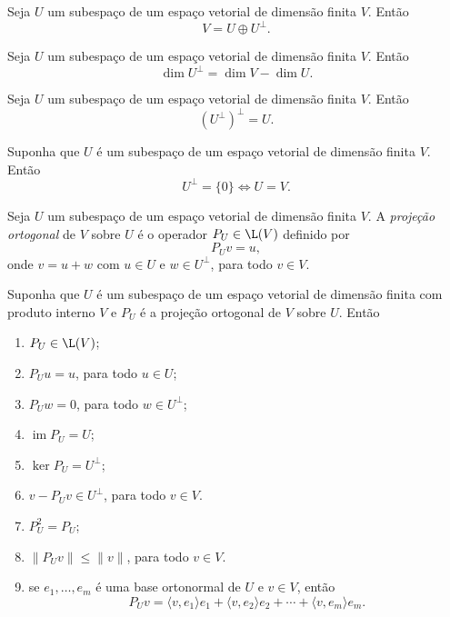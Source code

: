 \documentclass{article}
\DeclareMathOperator{\im}{im}
\begin{document}
\begin{prop}
    Seja \(U\) um subespaço de um espaço vetorial de dimensão finita \(V\). Então
    \[
        V = U \oplus U^\perp.
    \]
\end{prop}

\begin{cor}
    Seja \(U\) um subespaço de um espaço vetorial de dimensão finita \(V\). Então
    \[
        \dim U^\perp = \dim V - \dim U.
    \]
\end{cor}

\begin{cor}
    Seja \(U\) um subespaço de um espaço vetorial de dimensão finita \(V\). Então
    \[
        (U^\perp)^\perp = U.
    \]
\end{cor}

\begin{cor}
    Suponha que \(U\) é um subespaço de um espaço vetorial de dimensão finita \(V\). Então 
    \[
        U^\perp = \{0\} \iff U = V.
    \]
\end{cor}

\begin{defn}
    Seja \(U\) um subespaço de um espaço vetorial de dimensão finita \(V\). A \emph{projeção ortogonal} de \(V\) sobre \(U\) é o operador \(P_U \in \L(V)\) definido por 
    \[
        P_U v = u,
    \]
    \noindent onde \(v = u + w\) com \(u \in U\) e \(w \in U^\perp\), para todo \(v \in V\).
\end{defn}

\begin{prop} 
    Suponha que \(U\) é um subespaço de um espaço vetorial de dimensão finita com produto interno \(V\) e \(P_U\) é a projeção ortogonal de \(V\) sobre \(U\). Então
    \begin{enumerate}
        \item [(a)] \(P_U \in \L(V)\);
        \item [(b)] \(P_U u = u\), para todo \(u \in U\);
        \item [(c)] \(P_U w = 0\), para todo \(w \in U^\perp\);
        \item [(d)] \(\im P_U = U\);
        \item [(e)] \(\ker P_U = U^\perp\);
        \item [(f)] \(v - P_U v \in U^\perp\), para todo \(v \in V\).
        \item [(g)] \(P_U^2 = P_U\);
        \item [(h)] \(\|P_U v\| \leq \|v\|\), para todo \(v \in V\).
        \item [(i)] se \(e_1, \ldots, e_m\) é uma base ortonormal de \(U\) e \(v \in V\), então
        \[
            P_U v = \langle v, e_1 \rangle e_1 + \langle v, e_2 \rangle e_2 + \cdots + \langle v, e_m \rangle e_m.
        \]
    \end{enumerate}
\end{prop}
\end{document}
